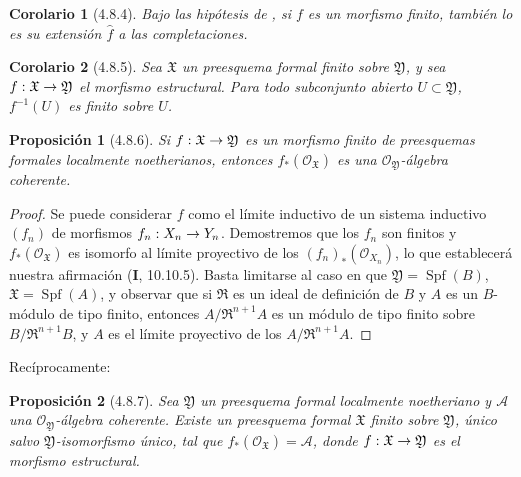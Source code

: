 \documentclass[10pt,oneside,openany]{book}
\theoremstyle{egaenv}\newtheorem*{env}{---}
\theoremstyle{egastatement}
\newtheorem*{proposition}{Proposición}
\newtheorem*{corollary}{Corolario}
\theoremstyle{egadescription}
\renewcommand{\to}{\mathchoice{\longrightarrow}{\rightarrow}{\rightarrow}{\rightarrow}}
\begin{document}
\begin{corollary}[4.8.4]
\label{III.4.8.4}
\label{III.4.8.4-fr}
Bajo las hipótesis de , si $f$ es un morfismo
finito, también lo es su extensión $\widehat f$ a las
completaciones.
\end{corollary}

\begin{corollary}[4.8.5]
\label{III.4.8.5}
\label{III.4.8.5-fr}
Sea $\mathfrak X$ un preesquema formal finito sobre
$\mathfrak Y$, y sea
$f:\mathfrak X\to\mathfrak Y$ el morfismo estructural. Para
todo subconjunto abierto $U\subset\mathfrak Y$, $f^{-1}(U)$ es finito sobre $U$.
\end{corollary}

\begin{proposition}[4.8.6]
\label{III.4.8.6}
\label{III.4.8.6-fr}
Si $f:\mathfrak X\to\mathfrak Y$ es un morfismo finito de preesquemas
formales localmente noetherianos, entonces
$f_*(\mathcal O_{\mathfrak X})$ es una
$\mathcal O_{\mathfrak Y}$-álgebra coherente.
\end{proposition}

\begin{proof}
Se puede considerar $f$ como el límite inductivo de un sistema inductivo
$(f_n)$ de morfismos $f_n:X_n\to Y_n$. Demostremos que los
$f_n$ son finitos y $f_*(\mathcal O_{\mathfrak X})$ es
isomorfo al límite proyectivo de los
$(f_n)_*(\mathcal O_{X_n})$, lo que establecerá nuestra afirmación (\textbf{I}, 10.10.5).
Basta limitarse al caso en que $\mathfrak Y=\operatorname{Spf}(B)$,
$\mathfrak X=\operatorname{Spf}(A)$, y observar que si $\mathfrak R$ es un ideal de definición
de $B$ y $A$ es un $B$-módulo de tipo finito, entonces
$A/\mathfrak R^{n+1}A$ es un módulo de tipo finito sobre
$B/\mathfrak R^{n+1}B$, y $A$ es el límite proyectivo de los
$A/\mathfrak R^{n+1}A$.
\end{proof}

Recíprocamente:

\begin{proposition}[4.8.7]
\label{III.4.8.7}
\label{III.4.8.7-fr}
Sea $\mathfrak Y$ un preesquema formal localmente noetheriano y
$\mathcal A$ una $\mathcal O_{\mathfrak Y}$-álgebra coherente. Existe
un preesquema formal $\mathfrak X$ finito sobre $\mathfrak Y$,
único salvo $\mathfrak Y$-isomorfismo único, tal que
$f_*(\mathcal O_{\mathfrak X})=\mathcal A$,
donde $f:\mathfrak X\to\mathfrak Y$ es el morfismo estructural.
\end{proposition}
\end{document}
